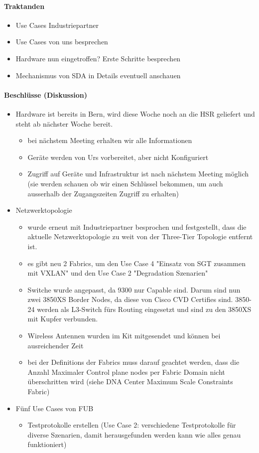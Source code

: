 \paragraph{Traktanden}
\begin{itemize}	
	\item Use Cases Industriepartner
	\item Use Cases von uns besprechen
	\item Hardware nun eingetroffen? Erste Schritte besprechen
	\item Mechanismus von SDA in Details eventuell anschauen
\end{itemize}

\paragraph{Beschlüsse (Diskussion)}
\begin{itemize}	
	\item Hardware ist bereits in Bern, wird diese Woche noch an die HSR geliefert und steht ab nächster Woche bereit.
	\begin{itemize}
		\item bei nächstem Meeting erhalten wir alle Informationen
		\item Geräte werden von Urs vorbereitet, aber nicht Konfiguriert
		\item Zugriff auf Geräte und Infrastruktur ist nach nächstem Meeting möglich (sie werden schauen ob wir einen Schlüssel bekommen, um auch ausserhalb der Zugangszeiten Zugriff zu erhalten)
	\end{itemize}
	\item Netzwerktopologie
	\begin{itemize}
		\item wurde erneut mit Industriepartner besprochen und festgestellt, dass die aktuelle Netzwerktopologie zu weit von der Three-Tier Topologie entfernt ist.
		\item es gibt neu 2 Fabrics, um den Use Case 4 "Einsatz von SGT zusammen mit VXLAN" und den Use Case 2 "Degradation Szenarien"
		\item Switche wurde angepasst, da 9300 nur Capable sind. Darum sind nun zwei 3850XS Border Nodes, da diese von Cisco CVD Certifies sind. 3850-24 werden als L3-Switch fürs Routing eingesetzt und sind zu den 3850XS mit Kupfer verbunden.
		\item Wireless Antennen wurden im Kit mitgesendet und können bei ausreichender Zeit 
		\item bei der Definitions der Fabrics muss darauf geachtet werden, dass die Anzahl Maximaler Control plane nodes per Fabric Domain nicht überschritten wird (siehe DNA Center Maximum Scale Constraints Fabric)
	\end{itemize}
	\item Fünf Use Cases von FUB
	\begin{itemize}
		\item Testprotokolle erstellen (Use Case 2: verschiedene Testprotokolle für diverse Szenarien, damit herausgefunden werden kann wie alles genau funktioniert)
	\end{itemize}
\end{itemize}

